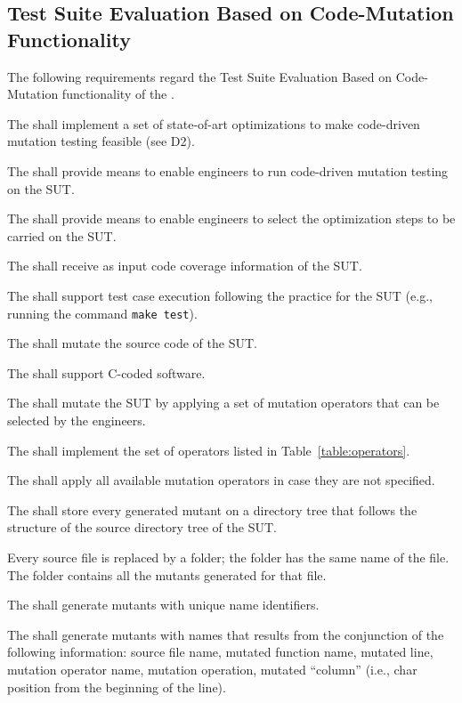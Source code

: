 

\subsection{Test Suite Evaluation Based on Code-Mutation Functionality}
\label{sec:codeDriven}

The following requirements regard the Test Suite Evaluation Based on Code-Mutation functionality of the \FAQAS.

\RQ{} The \FAQAS shall implement a set of state-of-art optimizations to make code-driven mutation testing feasible (see D2).

\RQ{} The \FAQAS shall provide means to enable engineers to run code-driven mutation testing on the SUT.

\RQ{} The \FAQAS shall provide means to enable engineers to select the optimization steps to be carried on the SUT.

\RQ{} The \FAQAS shall receive as input code coverage information of the SUT.

\RQ{} The \FAQAS shall support test case execution following the practice for the SUT (e.g., running the command \texttt{make test}).

\RQ{} The \FAQAS shall mutate the source code of the SUT.

\RQ{} The \FAQAS shall support C-coded software.

\RQ{} The \FAQAS shall mutate the SUT by applying a set of mutation operators that can be selected by the engineers.

\RQ{} The \FAQAS shall implement the set of operators listed in Table~\ref{table:operators}.



\RQ{} The \FAQAS shall apply all available mutation operators in case they are not specified.

\RQ{} The \FAQAS shall store every generated mutant on a directory tree that follows the structure of the source directory tree of the SUT.

\remark Every source file is replaced by a folder; the folder has the same name of the file. The folder contains all the mutants generated for that file. 

\RQ{} The \FAQAS shall generate mutants with unique name identifiers.

\RQ{} The \FAQAS shall generate mutants with names that results from the conjunction of the following information:
source file name, mutated function name, mutated line, mutation operator name, mutation operation, mutated ``column'' (i.e., char position from the beginning of the line).

